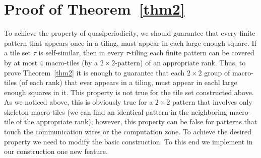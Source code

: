 \documentclass[runningheads]{llncs}
\begin{document}
\section{Proof of Theorem~\ref{thm2}}

To achieve the property of quasiperiodicity, we should guarantee  that every finite pattern that appears once in a tiling, must appear in each large enough square.  If a tile set $\tau$ is self-similar, then in every $\tau$-tiling  each finite pattern  can be covered by at most $4$  macro-tiles  (by a $2\times2$-pattern)  of an appropriate rank. Thus, to prove Theorem~\ref{thm2} it is enough to guarantee that each $2\times2$ group of macro-tiles (of each rank) that ever appears in a tiling, must appear  in eachl large enough squares in it. This property is not true for the tile set constructed above. As we noticed above, this is obviously true for a $2\times2$ pattern that involves only skeleton macro-tiles (we can find an identical pattern in the neighboring macro-tile of the appropriate rank); however, this property can be false for patterns that touch the communication wires or the computation zone.
To achieve the desired property we need to modify  the basic construction. To this end we implement in our construction one new feature.
\end{document}
